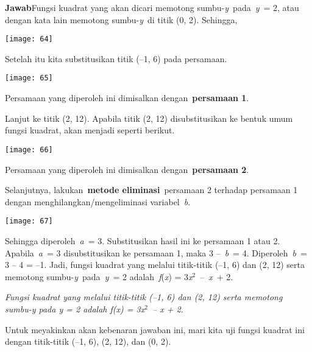 \documentclass[11pt,fleqn]{book} %
\begin{document}
\begin{myEnumerate}
\begin{itemize}
\noindent \textbf{Jawab}Fungsi kuadrat yang akan dicari memotong sumbu-\textit{y}~pada~\textit{y}~= 2, atau dengan kata lain memotong sumbu-\textit{y}~di titik (0, 2). Sehingga,

\begin{center}
\noindent \texttt{[image: 64]}
\end{center}

\noindent Setelah itu kita substitusikan titik (--1, 6) pada persamaan.

\begin{center}
\noindent \texttt{[image: 65]}
\end{center}

\noindent Persamaan yang diperoleh ini dimisalkan dengan~\textbf{persamaan 1}.

\noindent Lanjut ke titik (2, 12). Apabila titik (2, 12) disubstitusikan ke bentuk umum fungsi kuadrat, akan menjadi seperti berikut.

\begin{center}
\noindent \texttt{[image: 66]}
\end{center}

\noindent Persamaan yang diperoleh ini dimisalkan dengan~\textbf{persamaan 2}.

\noindent Selanjutnya, lakukan~\textbf{metode eliminasi}~persamaan 2 terhadap persamaan 1 dengan menghilangkan/mengeliminasi variabel~\textit{b}.

\begin{center}
\noindent \texttt{[image: 67]}
\end{center}

\noindent Sehingga diperoleh~\textit{a}~= 3. Substitusikan hasil ini ke persamaan 1 atau 2. Apabila~\textit{a}~= 3 disubstitusikan ke persamaan 1, maka 3 --~\textit{b}~= 4. Diperoleh~\textit{b}~= 3 -- 4 = --1. Jadi, fungsi kuadrat yang melalui titik-titik (--1, 6) dan (2, 12) serta memotong sumbu-\textit{y}~pada~\textit{y}~= 2 adalah~\textit{f}(\textit{x}) = 3\textit{x}${}^{2}$~--~\textit{x}~+ 2.

\noindent \textit{Fungsi kuadrat yang melalui titik-titik (--1, 6) dan (2, 12) serta memotong sumbu-y pada  y = 2 adalah f(x) = 3x${}^{2}$~-- x + 2.}

\noindent Untuk meyakinkan akan kebenaran jawaban ini, mari kita uji fungsi kuadrat ini dengan titik-titik (--1, 6), (2, 12), dan (0, 2).


\end{itemize}
\end{myEnumerate}
\end{document}
